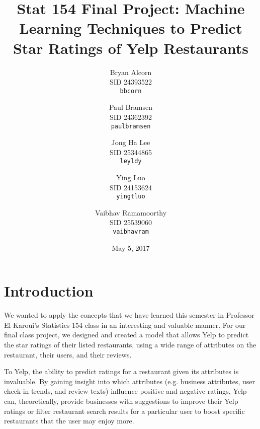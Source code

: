 \documentclass[10pt]{article}
\title{Stat 154 Final Project: Machine Learning Techniques to Predict Star Ratings of Yelp Restaurants}
\author{
    Bryan Alcorn \\
    \small SID 24393522 \\
    \small \texttt{bbcorn}
    \and 
    Paul Bramsen \\
    \small SID 24362392 \\
    \small \texttt{paulbramsen}
    \and 
    Jong Ha Lee \\
    \small SID 25344865 \\
    \small \texttt{leyldy}
    \and 
    Ying Luo \\ 
    \small SID 24153624 \\
    \small \texttt{yingtluo}
    \and 
    Vaibhav Ramamoorthy \\
    \small SID 25539060 \\
    \small \texttt{vaibhavram}
}
\date{May 5, 2017}
\begin{document}
\maketitle


\section{Introduction}
We wanted to apply the concepts that we have learned this semester in Professor El Karoui's Statistics 154 class in an interesting and valuable manner. For our final class project, we designed and created a model that allows Yelp to predict the star ratings of their listed restaurants, using a wide range of attributes on the restaurant, their users, and their reviews.
\vspace{0.1in}

\noindent
To Yelp, the ability to predict ratings for a restaurant given its attributes is invaluable. By gaining insight into which attributes (e.g. business attributes, user check-in trends, and review texts) influence positive and negative ratings, Yelp can, theoretically, provide businesses with suggestions to improve their Yelp ratings or filter restaurant search results for a particular user to boost specific restaurants that the user may enjoy more.
\vspace{0.1in}
\end{document}
